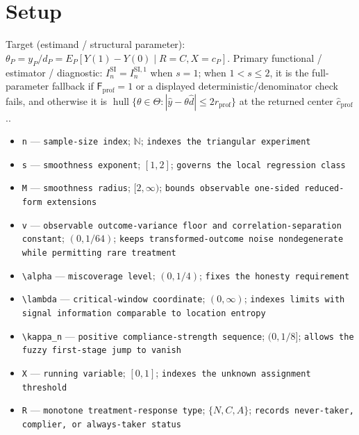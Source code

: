 \documentclass{article}
\begin{document}
\section{Setup}

Target (estimand / structural parameter): \(\theta_P=y_P/d_P=E_P[Y(1)-Y(0)\mid R=C,X=c_P]\).
Primary functional / estimator / diagnostic: \(I_n^{\mathrm{SI}}=I_n^{\mathrm{SI},1}\) when \(s=1\); when \(1<s\le2\), it is the full-parameter fallback if \(\mathsf F_{\mathrm{prof}}=1\) or a displayed deterministic/denominator check fails, and otherwise it is \(\operatorname{hull}\{\theta\in\Theta:|\widehat y-\theta\widehat d|\le2r_{\mathrm{prof}}\}\) at the returned center \(\widehat c_{\mathrm{prof}}\)..
\begin{itemize}
  \item \texttt{n} --- \texttt{sample-\allowbreak{}size index}; \(\mathbb N\); \texttt{indexes the triangular experiment}
  \item \texttt{s} --- \texttt{smoothness exponent}; \([1,2]\); \texttt{governs the local regression class}
  \item \texttt{M} --- \texttt{smoothness radius}; \([2,\infty)\); \texttt{bounds observable one-\allowbreak{}sided reduced-\allowbreak{}form extensions}
  \item \texttt{v} --- \texttt{observable outcome-\allowbreak{}variance floor and correlation-\allowbreak{}separation constant}; \((0,1/64)\); \texttt{keeps transformed-\allowbreak{}outcome noise nondegenerate while permitting rare treatment}
  \item \texttt{\textbackslash{}\allowbreak{}alpha} --- \texttt{miscoverage level}; \((0,1/4)\); \texttt{fixes the honesty requirement}
  \item \texttt{\textbackslash{}\allowbreak{}lambda} --- \texttt{critical-\allowbreak{}window coordinate}; \((0,\infty)\); \texttt{indexes limits with signal information comparable to location entropy}
  \item \texttt{\textbackslash{}\allowbreak{}kappa\_\allowbreak{}n} --- \texttt{positive compliance-\allowbreak{}strength sequence}; \((0,1/8]\); \texttt{allows the fuzzy first-\allowbreak{}stage jump to vanish}
  \item \texttt{X} --- \texttt{running variable}; \([0,1]\); \texttt{indexes the unknown assignment threshold}
  \item \texttt{R} --- \texttt{monotone treatment-\allowbreak{}response type}; \(\{N,C,A\}\); \texttt{records never-\allowbreak{}taker,\allowbreak{} complier,\allowbreak{} or always-\allowbreak{}taker status}

\end{itemize}
\end{document}

